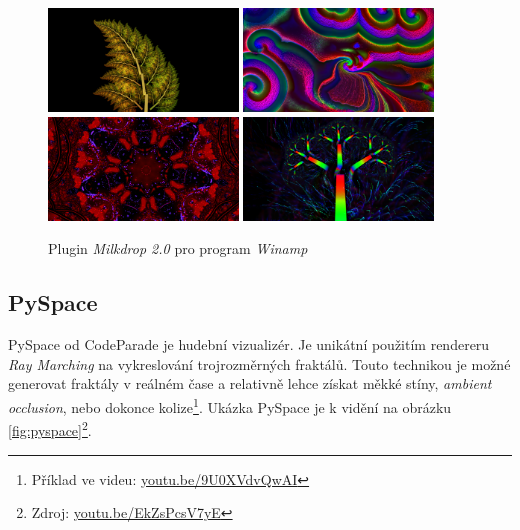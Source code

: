 \documentclass[thesis=B, czech]{FITthesis}[2019/03/06]
\begin{document}
\begin{figure}
    \centering
    \noindent
    \includegraphics[width=0.45\textwidth]{images/winamp0.png}\hspace{0.05\textwidth}%
    \includegraphics[width=0.45\textwidth]{images/winamp1.png}\\[1em]
    \includegraphics[width=0.45\textwidth]{images/winamp2.png}\hspace{0.05\textwidth}%
    \includegraphics[width=0.45\textwidth]{images/winamp3.png}\par
    \caption{Plugin \textit{Milkdrop 2.0} pro program \textit{Winamp}}
    \label{fig:milkdrop}
\end{figure}


\subsection*{PySpace}
PySpace od CodeParade\cite{CodeParade} je hudební vizualizér. Je unikátní použitím rendereru \textit{Ray Marching} na vykreslování trojrozměrných fraktálů. Touto technikou je možné generovat fraktály v reálném čase a relativně lehce získat měkké stíny, \textit{ambient occlusion}, nebo dokonce kolize\footnote{Příklad ve videu: \url{youtu.be/9U0XVdvQwAI}}. Ukázka PySpace je k vidění na obrázku \ref{fig:pyspace}\footnote{Zdroj: \url{youtu.be/EkZsPcsV7yE}}.
\end{document}

